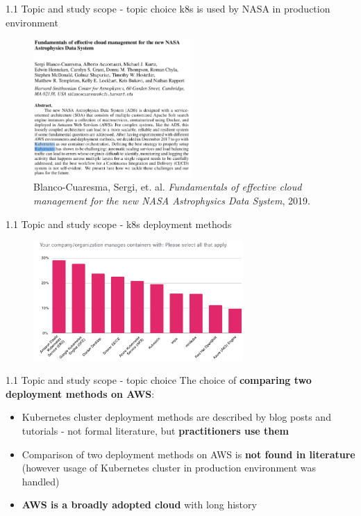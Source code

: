 \documentclass{beamer}
\begin{document}
\begin{frame}{1.1 Topic and study scope - topic choice}%
k8s is used by NASA in production environment
\begin{center}
	\begin{figure}
		\includegraphics[width=6cm]{figures/k8s-used-by-nasa.png}
		\label{fig:k8s-used-by-nasa}
		\\
		\tiny{Blanco-Cuaresma, Sergi, et. al. \textit{Fundamentals of effective cloud management for the new NASA Astrophysics Data System}, 2019.}
	\end{figure}	
\end{center}
\end{frame}

\begin{frame}{1.1 Topic and study scope - k8s deployment methods}%
\begin{center}
	\begin{figure}
	\includegraphics[width=8cm]{figures/cncf-k8s-deployment-methods.png}
	\label{fig:cncf-k8s-deployment-methods}
	\\
	\end{figure}	
\end{center}
\end{frame}

\begin{frame}{1.1 Topic and study scope - topic choice}%
The choice of \textbf{comparing two deployment methods on AWS}:
	\begin{itemize}
		\item Kubernetes cluster deployment methods are described by blog posts and tutorials - not formal literature, but \textbf{practitioners use them}
		\item Comparison of two deployment methods on AWS is \textbf{not found in literature} (however usage of Kubernetes cluster in production environment was handled)
		\item \textbf{AWS is a broadly adopted cloud} with long history
	\end{itemize}
\end{frame}
	
\end{document}
